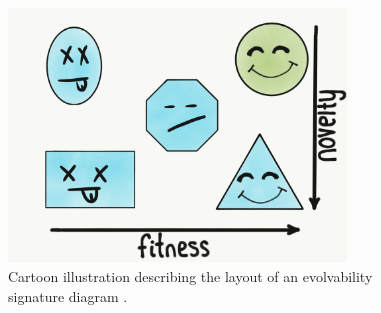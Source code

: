 \begin{figure}
  \includegraphics[width=0.8\textwidth]{img/reading_evolvability_signature}
  \captionsetup{singlelinecheck=off,justification=raggedright}
  \caption{Cartoon illustration describing the layout of an evolvability signature diagram \cite{Tarapore2015EvolvabilityBenchmarks}.}
  \label{fig:reading_evolvability_signature}
\end{figure}